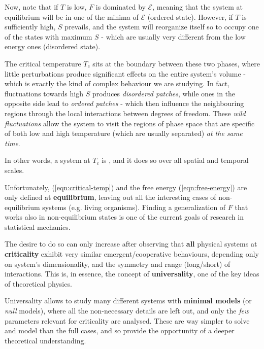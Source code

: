 \documentclass[../../main.tex]{subfiles}
\begin{document}
\begin{itemize}
    \medskip 

    Now, note that if $T$ is low, $F$ is dominated by $\mathcal{E}$, meaning that the system at equilibrium will be in one of the minima of $\mathcal{E}$ (ordered state). However, if $T$ is sufficiently high, $S$ prevails, and the system will reorganize itself so to occupy one of the states with maximum $S$ - which are usually very different from the low energy ones (disordered state).
    
    The critical temperature $T_c$ sits at the boundary between these two phases, where little perturbations produce significant effects on the entire system's volume - which is exactly the kind of complex behaviour we are studying. In fact, fluctuations towards high $S$ produces \textit{disordered patches}, while ones in the opposite side lead to \textit{ordered patches} - which then influence the neighbouring regions through the local interactions between degrees of freedom. These \textit{wild fluctuations} allow the system to visit the regions of phase space that are specific of both low and high temperature (which are usually separated) \textit{at the same time}.

    \medskip

    In other words, a system at $T_c$ is , and it does so over all spatial and temporal scales.
\end{itemize}

Unfortunately, (\ref{eqn:critical-temp}) and the free energy (\ref{eqn:free-energy}) are only defined at \textbf{equilibrium}, leaving out all the interesting cases of non-equilibrium systems (e.g. living organisms). Finding a generalization of $F$ that works also in non-equilibrium states is one of the current goals of research in statistical mechanics. 

\medskip

The desire to do so can only increase after observing that \textbf{all} physical systems at \textbf{criticality} exhibit very similar emergent/cooperative behaviours, depending only on system's dimensionality, and the symmetry and range (long/short) of interactions. This is, in essence, the concept of \textbf{universality}, one of the key ideas of theoretical physics. 

\medskip

Universality allows to study many different systems with \textbf{minimal models} (or \textit{null} models), where all the non-necessary details are left out, and only the \textit{few} parameters relevant for criticality are analysed. These are way simpler to solve and model than the full cases, and so provide the opportunity of a deeper theoretical understanding.
\end{document}
